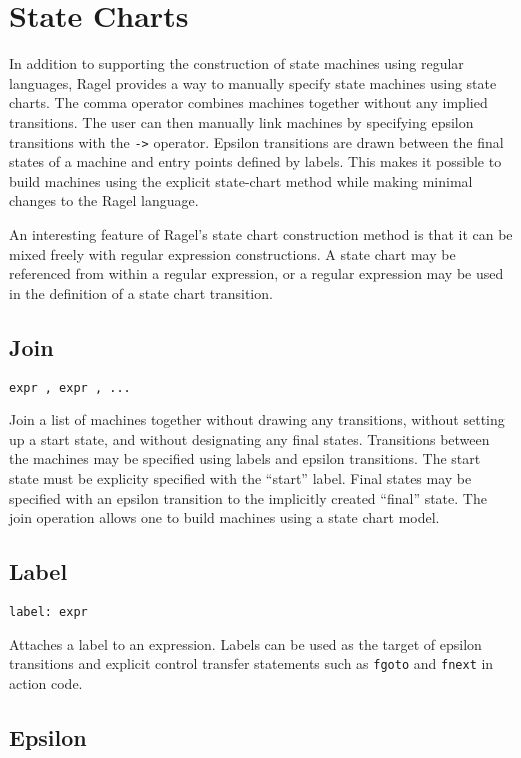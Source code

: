 \documentclass[letterpaper,11pt,oneside]{book}
\begin{document}
\section{State Charts}
\label{state-charts}

In addition to supporting the construction of state machines using regular
languages, Ragel provides a way to manually specify state machines using
state charts.  The comma operator combines machines together without any
implied transitions. The user can then manually link machines by specifying
epsilon transitions with the \verb|->| operator.  Epsilon transitions are drawn
between the final states of a machine and entry points defined by labels.  This
makes it possible to build machines using the explicit state-chart method while
making minimal changes to the Ragel language. 

An interesting feature of Ragel's state chart construction method is that it
can be mixed freely with regular expression constructions. A state chart may be
referenced from within a regular expression, or a regular expression may be
used in the definition of a state chart transition.

\subsection{Join}

\verb|expr , expr , ...|

Join a list of machines together without
drawing any transitions, without setting up a start state, and without
designating any final states. Transitions between the machines may be specified
using labels and epsilon transitions. The start state must be explicity
specified with the ``start'' label. Final states may be specified with an
epsilon transition to the implicitly created ``final'' state. The join
operation allows one to build machines using a state chart model.

\subsection{Label}

\verb|label: expr| 

Attaches a label to an expression. Labels can be
used as the target of epsilon transitions and explicit control transfer
statements such as \verb|fgoto| and \verb|fnext| in action
code.

\subsection{Epsilon}
\end{document}
